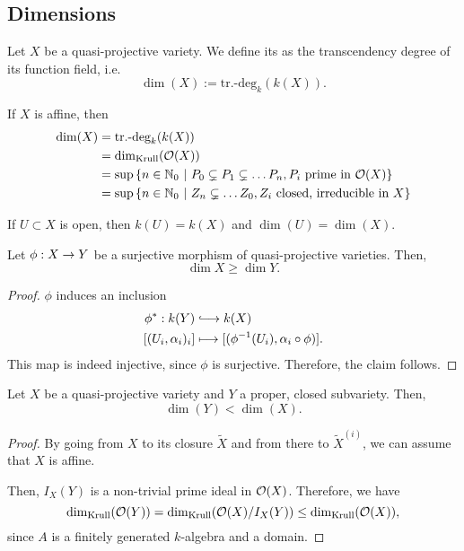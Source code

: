 \subsection{Dimensions}
\begin{definition}
	Let $X$ be a quasi-projective variety. We define its  as the transcendency degree of its function field, i.e.
	\[ \dim(X) := \text{tr.-deg}_k(k(X)). \]
\end{definition}
\begin{remark}
	If $X$ is affine, then
	\begin{align*}
	\dim (X) &= \text{tr.-deg}_k(k(X))\\
	&=\dim_{\mathrm{Krull}}(\mathcal{O}(X))\\
	&= \sup\left\lbrace n \in \mathbb{N}_0 ~ | ~ P_0\subsetneq P_1\subsetneq \ldots P_n, P_i \text{ prime in }\mathcal{O}(X) \right\rbrace\\
	&= \sup\left\lbrace n \in \mathbb{N}_0 ~ | ~ Z_n\subsetneq \ldots Z_0, Z_i \text{ closed, irreducible in }X \right\rbrace
	\end{align*}
\end{remark}
\begin{remark}
	If $U \subset X$ is open, then $k(U) = k(X)$ and $\dim(U) = \dim (X)$.
\end{remark}
\begin{lemma}
	Let $\phi : X \overset{}{\rightarrow} Y$ be a surjective morphism of quasi-projective varieties. Then,
	\[ \dim X \geq \dim Y. \]
\end{lemma}
\begin{proof}
	$\phi$ induces an inclusion
	\begin{align*}
	 \phi^* : k(Y) &\Inj{} k(X)\\
	 [(U_i, \alpha_i)_i] & \longmapsto [(\phi\i(U_i), \alpha_i\circ \phi)].
	\end{align*}
This map is indeed injective, since $\phi$ is surjective. Therefore, the claim follows.
\end{proof}
\begin{lemma}
	Let $X$ be a quasi-projective variety and $Y$ a proper, closed subvariety. Then,
	\[ \dim(Y) < \dim(X). \]
\end{lemma}
\begin{proof}
By going from $X$ to its closure $\widetilde{X}$ and from there to $\widetilde{X}^{(i)}$, we can assume that $X$ is affine.

Then, $I_X(Y)$ is a non-trivial prime ideal in $\mathcal{O}(X)$. Therefore, we have
\[ \dim_{\mathrm{Krull}}(\mathcal{O}(Y)) = \dim_{\mathrm{Krull}}(\mathcal{O}(X) / I_X(Y)) \leq \dim_{\mathrm{Krull}}(\mathcal{O}(X) ), \]
since $A$ is a finitely generated $k$-algebra and a domain.
\end{proof}

